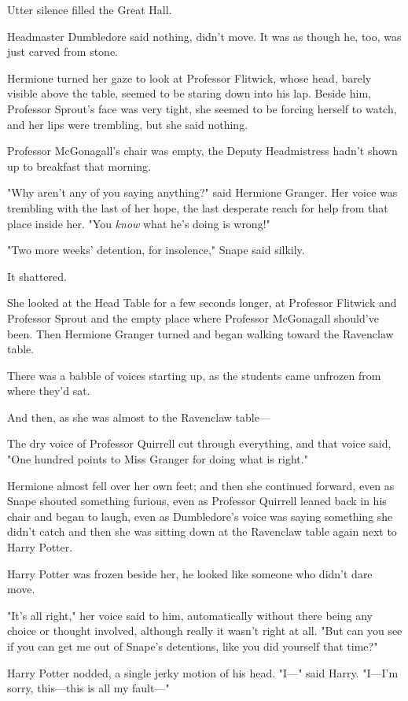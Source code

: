 Utter silence filled the Great Hall.

Headmaster Dumbledore said nothing, didn't move. It was as though he, too, was
just carved from stone.

Hermione turned her gaze to look at Professor Flitwick, whose head, barely
visible above the table, seemed to be staring down into his lap. Beside him,
Professor Sprout's face was very tight, she seemed to be forcing herself to
watch, and her lips were trembling, but she said nothing.

Professor McGonagall's chair was empty, the Deputy Headmistress hadn't shown up
to breakfast that morning.

"Why aren't any of you saying anything?" said Hermione Granger. Her voice was
trembling with the last of her hope, the last desperate reach for help from
that place inside her. "You \emph{know} what he's doing is wrong!"

"Two more weeks' detention, for insolence," Snape said silkily.

It shattered.

She looked at the Head Table for a few seconds longer, at Professor Flitwick
and Professor Sprout and the empty place where Professor McGonagall should've
been. Then Hermione Granger turned and began walking toward the Ravenclaw table.

There was a babble of voices starting up, as the students came unfrozen from
where they'd sat.

And then, as she was almost to the Ravenclaw table---

The dry voice of Professor Quirrell cut through everything, and that voice
said, "One hundred points to Miss Granger for doing what is right."

Hermione almost fell over her own feet; and then she continued forward, even as
Snape shouted something furious, even as Professor Quirrell leaned back in his
chair and began to laugh, even as Dumbledore's voice was saying something she
didn't catch and then she was sitting down at the Ravenclaw table again next to
Harry Potter.

Harry Potter was frozen beside her, he looked like someone who didn't dare move.

"It's all right," her voice said to him, automatically without there being any
choice or thought involved, although really it wasn't right at all. "But can
you see if you can get me out of Snape's detentions, like you did yourself that
time?"

Harry Potter nodded, a single jerky motion of his head. "I\mbox{---}" said Harry.
"I---I'm sorry, this---this is all my fault\mbox{---}"


